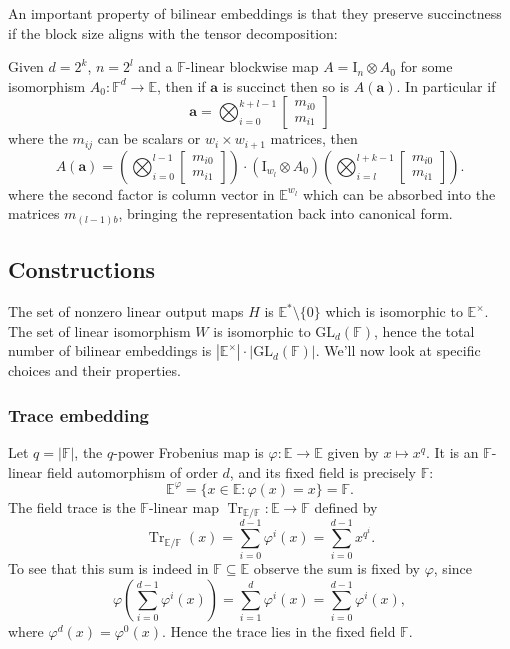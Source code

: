 An important property of bilinear embeddings is that they preserve succinctness if the block size aligns with the tensor decomposition:

\begin{theorem}\label{suc-embed}
Given $d = 2^k$, $n = 2^l$ and a $\mathbb{F}$-linear blockwise map $A = \mathrm{I}_n \otimes A_0$ for some isomorphism $A_0 : \mathbb{F}^d \to \mathbb{E}$, then if $\mathbf{a}$  is succinct then so is $A(\mathbf{a})$. In particular if
\[
\mathbf{a} = \bigotimes_{i=0}^{k+l-1} 
\begin{bmatrix}
m_{i0} \\ m_{i1}
\end{bmatrix}
\]
where the $m_{ij}$ can be scalars or $w_i \times w_{i+1}$ matrices, then
\[
A(\mathbf{a}) = 
\left(
\bigotimes_{i=0}^{l-1} 
\begin{bmatrix}
m_{i0} \\ m_{i1}
\end{bmatrix}
\right) \cdot
(\mathrm{I}_{w_l} \otimes A_0)\left(
\bigotimes_{i=l}^{l+k-1} 
\begin{bmatrix}
m_{i0} \\ m_{i1}
\end{bmatrix}
\right)\text{.}
\]
where the second factor is column vector in $\mathbb{E}^{w_l}$ which can be absorbed into the matrices $m_{(l-1)b}$, bringing the representation back into canonical form.
\end{theorem}

\subsection{Constructions}

The set of nonzero linear output maps $H$ is $\mathbb{E}^* \setminus \{0\}$ which is isomorphic to $\mathbb{E}^\times$. The set of linear isomorphism $W$ is isomorphic to $\mathrm{GL}_d(\mathbb{F})$, hence the total number of bilinear embeddings is $|\mathbb{E}^\times| \cdot |\mathrm{GL}_d(\mathbb{F})|$. We'll now look at specific choices and their properties.

\subsubsection{Trace embedding}

Let $q = |\mathbb F|$, the $q$-power Frobenius map is $\varphi:\mathbb E\to\mathbb E$ given by $x\mapsto x^q$. It is an $\mathbb F$-linear field automorphism of order $d$, and its
fixed field is precisely $\mathbb F$:
\[
\mathbb E^\varphi
= \{x\in\mathbb E:\varphi(x)=x\}
= \mathbb F.
\]
The field trace is the $\mathbb F$-linear map $\operatorname{Tr}_{\mathbb E/\mathbb F}:\mathbb E\to\mathbb F$ defined by
\[
\operatorname{Tr}_{\mathbb E/\mathbb F}(x)
= \sum_{i=0}^{d-1}\varphi^i(x)
= \sum_{i=0}^{d-1}x^{q^i}.
\]
To see that this sum is indeed in $\mathbb{F} \subseteq \mathbb{E}$ observe the sum is fixed by $\varphi$, since
\[
\varphi\left( \sum_{i=0}^{d-1}\varphi^i(x) \right)
= \sum_{i=1}^{d}\varphi^i(x)
= \sum_{i=0}^{d-1}\varphi^i(x),
\]
where $\varphi^d(x)=\varphi^0(x)$. Hence the trace lies in the fixed field $\mathbb F$.

